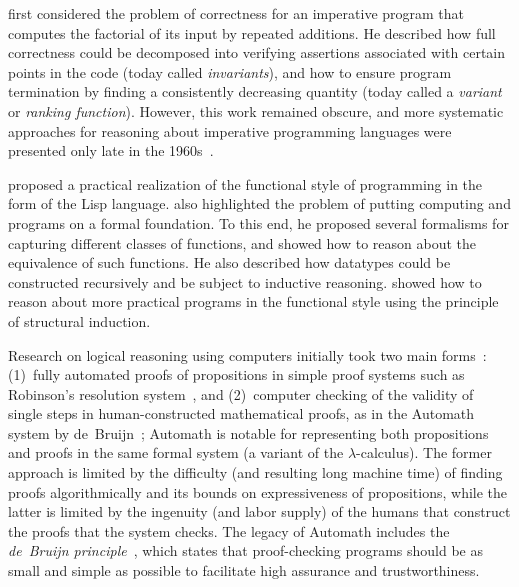 \cite{turing1949} first considered the problem of correctness for an imperative program that computes the factorial of its input by repeated additions. He described how full correctness could be decomposed into verifying assertions associated with certain points in the code (today called \emph{invariants}), and how to ensure program termination by finding a consistently decreasing quantity (today called a \emph{variant} or \emph{ranking function}). However, this work remained obscure, and more systematic approaches for reasoning about imperative programming languages were presented only late in the 1960s~\citep{Floyd1967Flowcharts,Hoare:CACM69}.

\cite{McCarthy1960} proposed a practical realization of the functional style of programming in the form of the Lisp language. \cite{McCarthy1963} also highlighted the problem of putting computing and programs on a formal foundation. To this end, he proposed several formalisms for capturing different classes of functions, and showed how to reason about the equivalence of such functions. He also described how datatypes could be constructed recursively and be subject to inductive reasoning. \cite{Burstall1969} showed how to reason about more practical programs in the functional style using the principle of structural induction.

Research on logical reasoning using computers initially took two main forms~\citep{Warden2009Book}: (1)~fully automated proofs of propositions in simple proof systems such as Robinson's resolution system~\citep{Robinson1965}, and (2)~computer checking of the validity of single steps in human-constructed mathematical proofs, as in the Automath system by de~Bruijn~\citep{DeBruijn1970,DeBruijn1994}; Automath is notable for representing both propositions and proofs in the same formal system (a variant of the $\lambda$-calculus). The former approach is limited by the difficulty (and resulting long machine time) of finding proofs algorithmically and its bounds on expressiveness of propositions, while the latter is limited by the ingenuity (and labor supply) of the humans that construct the proofs that the system checks.
The legacy of Automath includes the \emph{de~Bruijn principle}~\citep{Barendregt2002}, which states that proof-checking programs should be as small and simple as possible to facilitate high assurance and trustworthiness.


